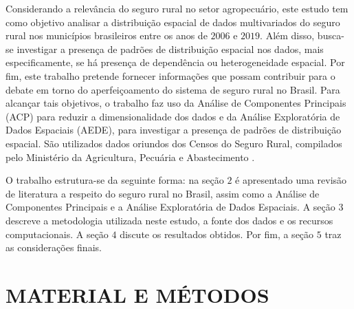 
Considerando a relevância do seguro rural no setor agropecuário, este estudo tem como objetivo analisar a distribuição espacial de dados multivariados do seguro rural nos municípios brasileiros entre os anos de $2006$ e $2019$. Além disso, busca-se investigar a presença de padrões de distribuição espacial nos dados, mais especificamente, se há presença de dependência ou heterogeneidade espacial. Por fim, este trabalho pretende fornecer informações que possam contribuir para o debate em torno do aperfeiçoamento do sistema de seguro rural no Brasil. Para alcançar tais objetivos, o trabalho faz uso da Análise de Componentes Principais (ACP) para reduzir a dimensionalidade dos dados e da Análise Exploratória de Dados Espaciais (AEDE), para investigar a presença de padrões de distribuição espacial. São utilizados dados oriundos dos Censos do Seguro Rural, compilados pelo Ministério da Agricultura, Pecuária e Abastecimento \cite{brasil21}.

O trabalho estrutura-se da seguinte forma: na seção $2$ é apresentado uma revisão de literatura a respeito do seguro rural no Brasil, assim como a Análise de Componentes Principais e a Análise Exploratória de Dados Espaciais. A seção $3$ descreve a metodologia utilizada neste estudo, a fonte dos dados e os recursos computacionais. A seção $4$ discute os resultados obtidos. Por fim, a seção $5$ traz as considerações finais. 





\section{MATERIAL E MÉTODOS}\label{methods}

